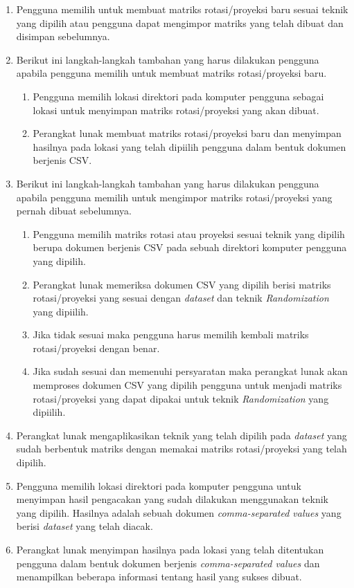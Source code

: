 \begin{enumerate}
    \item Pengguna memilih untuk membuat matriks rotasi/proyeksi baru sesuai teknik yang dipilih atau pengguna dapat mengimpor matriks yang telah dibuat dan disimpan sebelumnya.
    \item Berikut ini langkah-langkah tambahan yang harus dilakukan pengguna apabila pengguna memilih untuk membuat matriks rotasi/proyeksi baru.
    \begin{enumerate}
        \item Pengguna memilih lokasi direktori pada komputer pengguna sebagai lokasi untuk menyimpan matriks rotasi/proyeksi yang akan dibuat.
        \item Perangkat lunak membuat matriks rotasi/proyeksi baru dan menyimpan hasilnya pada lokasi yang telah dipiilih pengguna dalam bentuk dokumen berjenis CSV.
    \end{enumerate}
    \item Berikut ini langkah-langkah tambahan yang harus dilakukan pengguna apabila pengguna memilih untuk mengimpor matriks rotasi/proyeksi yang pernah dibuat sebelumnya.
    \begin{enumerate}
        \item Pengguna memilih matriks rotasi atau proyeksi sesuai teknik yang dipilih berupa dokumen berjenis CSV pada sebuah direktori komputer pengguna yang dipilih.
        \item Perangkat lunak memeriksa dokumen CSV yang dipilih berisi matriks rotasi/proyeksi yang sesuai dengan \textit{dataset} dan teknik \textit{Randomization} yang dipiilih.
        \item Jika tidak sesuai maka pengguna harus memilih kembali matriks rotasi/proyeksi dengan benar.
        \item Jika sudah sesuai dan memenuhi persyaratan maka perangkat lunak akan memproses dokumen CSV yang dipilih pengguna untuk menjadi matriks rotasi/proyeksi yang dapat dipakai untuk teknik \textit{Randomization} yang dipiilih.
    \end{enumerate}
    \item Perangkat lunak mengaplikasikan teknik yang telah dipilih pada \textit{dataset} yang sudah berbentuk matriks dengan memakai matriks rotasi/proyeksi yang telah dipilih.
    \item Pengguna memilih lokasi direktori pada komputer pengguna untuk menyimpan hasil pengacakan yang sudah dilakukan menggunakan teknik yang dipilih. Hasilnya adalah sebuah dokumen \textit{comma-separated values} yang berisi \textit{dataset} yang telah diacak.
    \item Perangkat lunak menyimpan hasilnya pada lokasi yang telah ditentukan pengguna dalam bentuk dokumen berjenis \textit{comma-separated values} dan menampilkan beberapa informasi tentang hasil yang sukses dibuat.
\end{enumerate}

